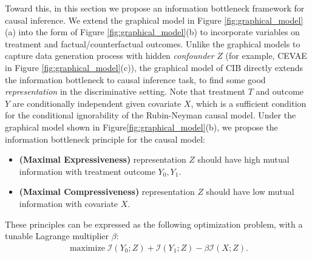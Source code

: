 \documentclass{article}
\DeclareMathOperator*{\maximize}{maximize}
\begin{document}
Toward this, in this section we propose an information bottleneck framework for causal inference. We extend the graphical model in Figure \ref{fig:graphical_model}(a) into the form of Figure \ref{fig:graphical_model}(b) to incorporate variables on treatment and factual/counterfactual outcomes. Unlike the graphical models to capture data generation process with hidden \emph{confounder} $Z$ (for example, CEVAE \cite{Louizos17} in Figure \ref{fig:graphical_model}(c)), the graphical model of CIB directly extends the information bottleneck to causal inference task, to find some good \emph{representation} in the discriminative setting.
Note that treatment $ T $ and outcome $ Y $ are conditionally independent given covariate $ X $, which is a sufficient condition for the conditional ignorability of the Rubin-Neyman causal model. Under the graphical model shown in Figure\ref{fig:graphical_model}(b), we propose the information bottleneck principle for the causal model:
    \begin{itemize}
        \item \textbf{(Maximal Expressiveness)} representation $Z$ should have high mutual information with treatment outcome $ Y_0, Y_1 $.
        \item \textbf{(Maximal Compressiveness)} representation $Z$ should have low mutual information with covariate $ X $.
    \end{itemize}
    These principles can be expressed as the following optimization problem, with a tunable Lagrange multiplier $\beta$:
    \begin{align}\label{EqnCIB}
      \maximize \mathcal{I}(Y_0;Z) + \mathcal{I}(Y_1;Z) - \beta \mathcal{I}(X;Z).
    \end{align}
    
\end{document}
